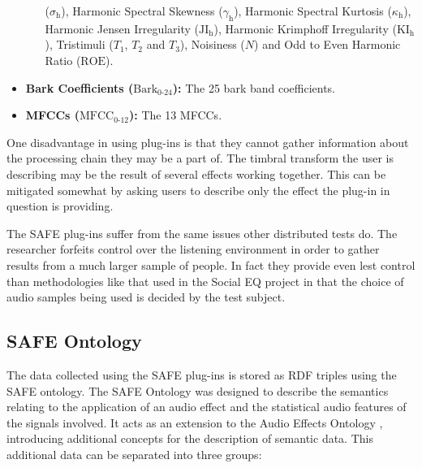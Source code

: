 \begin{itemize}
\begin{itemize}
				      ($\sigma_{\textrm{h}}$), Harmonic Spectral Skewness ($\gamma_{\textrm{h}}$), Harmonic
				      Spectral Kurtosis ($\kappa_{\textrm{h}}$), Harmonic Jensen Irregularity
				      ($\textrm{JI}_{\textrm{h}}$), Harmonic Krimphoff Irregularity
				      ($\textrm{KI}_{\textrm{h}}$), Tristimuli ($T_{1}$, $T_{2}$ and $T_{3}$), Noisiness
				      ($N$) and Odd to Even Harmonic Ratio ($\textrm{ROE}$).
			\end{itemize}
			\item {\bf{Bark Coefficients (}}$\textrm{Bark}_{0\textrm{-}24}${\bf{):}} The 25 bark band
			      coefficients.
			\item {\bf{MFCCs (}}$\textrm{MFCC}_{0\textrm{-}12}${\bf{):}} The 13 MFCCs.
		\end{itemize}

		One disadvantage in using plug-ins is that they cannot gather information about the processing chain they
		may be a part of. The timbral transform the user is describing may be the result of several effects working
		together. This can be mitigated somewhat by asking users to describe only the effect the plug-in in
		question is providing.

		The SAFE plug-ins suffer from the same issues other distributed tests do. The researcher forfeits control
		over the listening environment in order to gather results from a much larger sample of people. In fact they
		provide even lest control than methodologies like that used in the Social EQ project
		\citep{cartwright2013socialeq} in that the choice of audio samples being used is decided by the test
		subject. 

	\subsection{SAFE Ontology}
	\label{sec:TimbreEvaluation-DAWBasedTimbreEvaluation-SAFEOntology}

		The data collected using the SAFE plug-ins is stored as RDF triples using the SAFE ontology.  The SAFE
		Ontology was designed to describe the semantics relating to the application of an audio effect and the
		statistical audio features of the signals involved. It acts as an extension to the Audio Effects Ontology
		\citep{wilmering2013the}, introducing additional concepts for the description of semantic data.  This
		additional data can be separated into three groups:

